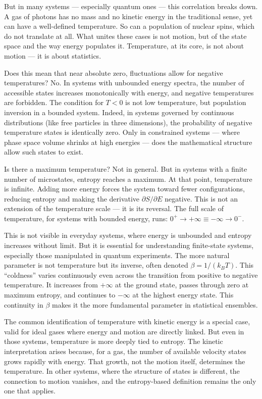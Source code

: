 But in many systems — especially quantum ones — this correlation breaks down. A gas of photons has no mass and no kinetic energy in the traditional sense, yet can have a well-defined temperature. So can a population of nuclear spins, which do not translate at all. What unites these cases is not motion, but of the state space and the way energy populates it. Temperature, at its core, is not about motion — it is about statistics.

Does this mean that near absolute zero, fluctuations allow for negative temperatures? No. In systems with unbounded energy spectra, the number of accessible states increases monotonically with energy, and negative temperatures are forbidden. The condition for $ T < 0 $ is not low temperature, but population inversion in a bounded system. Indeed, in systems governed by continuous distributions (like free particles in three dimensions), the probability of negative temperature states is identically zero. Only in constrained systems — where phase space volume shrinks at high energies — does the mathematical structure allow such states to exist.

Is there a maximum temperature? Not in general. But in systems with a finite number of microstates, entropy reaches a maximum. At that point, temperature is infinite. Adding more energy forces the system toward fewer configurations, reducing entropy and making the derivative $ \partial S/\partial E $ negative. This is not an extension of the temperature scale — it is its reversal. The full scale of temperature, for systems with bounded energy, runs: $0^+ \to +\infty \equiv -\infty \to 0^-.$

This is not visible in everyday systems, where energy is unbounded and entropy increases without limit. But it is essential for understanding finite-state systems, especially those manipulated in quantum experiments. The more natural parameter is not temperature but its inverse, often denoted $ \beta = 1/(k_B T) $. This “coldness” varies continuously even across the transition from positive to negative temperature. It increases from $ +\infty $ at the ground state, passes through zero at maximum entropy, and continues to $ -\infty $ at the highest energy state. This continuity in $ \beta $ makes it the more fundamental parameter in statistical ensembles.

The common identification of temperature with kinetic energy is a special case, valid for ideal gases where energy and motion are directly linked. But even in those systems, temperature is more deeply tied to entropy. The kinetic interpretation arises because, for a gas, the number of available velocity states grows rapidly with energy. That growth, not the motion itself, determines the temperature. In other systems, where the structure of states is different, the connection to motion vanishes, and the entropy-based definition remains the only one that applies.

